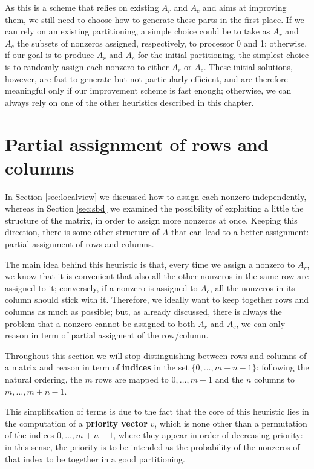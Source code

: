 As this is a scheme that relies on existing $A_r$ and $A_c$ and aims at improving them, we still need to choose how to generate these parts in the first place. If we can rely on an existing partitioning, a simple choice could be to take as $A_r$ and $A_c$ the subsets of nonzeros assigned, respectively, to processor 0 and 1; otherwise, if our goal is to produce $A_r$ and $A_c$ for the initial partitioning, the simplest choice is to randomly assign each nonzero to either $A_r$ or $A_c$. These initial solutions, however, are fast to generate but not particularly efficient, and are therefore meaningful only if our improvement scheme is fast enough; otherwise, we can always rely on one of the other heuristics described in this chapter.

\section{Partial assignment of rows and columns} \label{sec:hot_restart}

In Section \ref{sec:localview} we discussed how to assign each nonzero independently, whereas in Section \ref{sec:sbd} we examined the possibility of exploiting a little the structure of the matrix, in order to assign more nonzeros at once. Keeping this direction, there is some other structure of $A$ that can lead to a better assignment: partial assignment of rows and columns.

The main idea behind this heuristic is that, every time we assign a nonzero to $A_r$, we know that it is convenient that also all the other nonzeros in the same row are assigned to it; conversely, if a nonzero is assigned to $A_c$, all the nonzeros in its column should stick with it. Therefore, we ideally want to keep together rows and columns as much as possible; but, as already discussed, there is always the problem that a nonzero cannot be assigned to both $A_r$ and $A_c$, we can only reason in term of partial assigment of the row/column. 

Throughout this section we will stop distinguishing between rows and columns of a matrix and reason in term of \textbf{indices} in the set $\{0,\dots,m+n-1\}$: following the natural ordering, the $m$ rows are mapped to $0,\dots,m-1$ and the $n$ columns to $m,\dots,m+n-1$.

This simplification of terms is due to the fact that the core of this heuristic lies in the computation of a \textbf{priority vector} $v$, which is none other than a permutation of the indices $0,\dots,m+n-1$, where they appear in order of decreasing priority: in this sense, the priority is to be intended as the probability of the nonzeros of that index to be together in a good partitioning.

